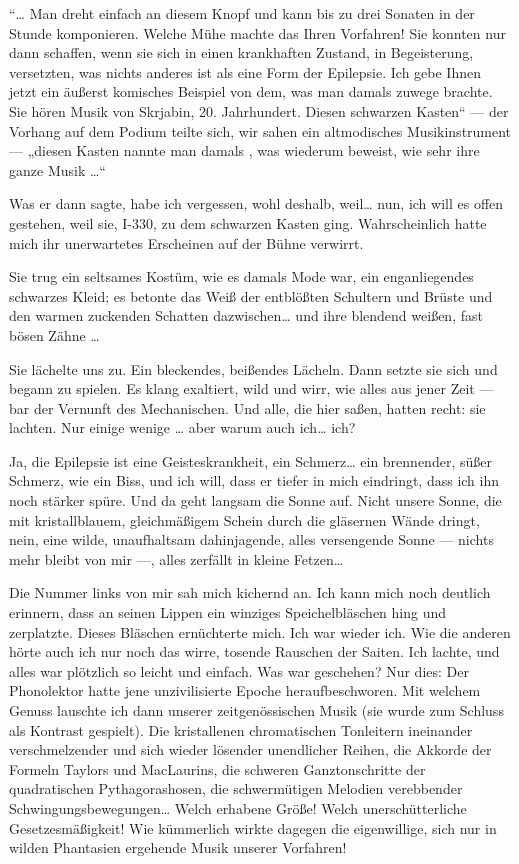 “\ldots{} Man dreht einfach an diesem Knopf und kann bis
zu drei Sonaten in der Stunde komponieren. Welche Mühe machte das
Ihren Vorfahren! Sie konnten nur dann schaffen, wenn sie sich in
einen krankhaften Zustand, in
\glq{}Begeisterung\grq{}, versetzten, was nichts
anderes ist als eine Form der Epilepsie. Ich gebe Ihnen jetzt ein
äußerst komisches Beispiel von dem, was man damals zuwege brachte.
Sie hören Musik von Skrjabin, 20. Jahrhundert. Diesen schwarzen
Kasten“ — der Vorhang auf dem Podium teilte sich, wir sahen ein
altmodisches Musikinstrument — „diesen Kasten nannte man damals
, was wiederum beweist, wie sehr ihre ganze Musik \ldots{}“

Was er
dann sagte, habe ich vergessen, wohl deshalb, weil\ldots{} nun, ich will
es offen gestehen, weil sie, I-330, zu dem schwarzen Kasten ging.
Wahrscheinlich hatte mich ihr unerwartetes Erscheinen auf der Bühne
verwirrt.

Sie trug ein seltsames Kostüm, wie es damals Mode war,
ein enganliegendes schwarzes Kleid; es betonte das Weiß der
entblößten Schultern und Brüste und den warmen zuckenden Schatten
dazwischen\ldots{} und ihre blendend weißen, fast bösen Zähne \ldots{}

Sie lächelte uns zu. Ein bleckendes, beißendes Lächeln. Dann setzte
sie sich und begann zu spielen. Es klang exaltiert, wild und wirr,
wie alles aus jener Zeit — bar der Vernunft des Mechanischen. Und
alle, die hier saßen, hatten recht: sie lachten. Nur einige wenige
\ldots{} aber warum auch ich\ldots{} ich?

Ja, die Epilepsie ist eine Geisteskrankheit, ein Schmerz\ldots{} ein
brennender, süßer Schmerz, wie ein Biss, und ich will, dass er
tiefer in mich eindringt, dass ich ihn noch stärker spüre. Und da
geht langsam die Sonne auf. Nicht unsere Sonne, die mit
kristallblauem, gleichmäßigem Schein durch die gläsernen Wände
dringt, nein, eine wilde, unaufhaltsam dahinjagende, alles
versengende Sonne — nichts mehr bleibt von mir —, alles zerfällt in
kleine Fetzen\ldots{}

Die Nummer links von mir sah mich kichernd an. Ich
kann mich noch deutlich erinnern, dass an seinen Lippen ein
winziges Speichelbläschen hing und zerplatzte. Dieses Bläschen
ernüchterte mich. Ich war wieder ich. Wie die anderen hörte auch
ich nur noch das wirre, tosende Rauschen der Saiten. Ich lachte,
und alles war plötzlich so leicht und einfach. Was war geschehen?
Nur dies: Der Phonolektor hatte jene unzivilisierte Epoche
heraufbeschworen. Mit welchem Genuss lauschte ich dann unserer
zeitgenössischen Musik (sie wurde zum Schluss als Kontrast
gespielt). Die kristallenen chromatischen Tonleitern ineinander
verschmelzender und sich wieder lösender unendlicher Reihen, die
Akkorde der Formeln Taylors und MacLaurins, die schweren
Ganztonschritte der quadratischen Pythagorashosen, die
schwermütigen Melodien verebbender Schwingungsbewegungen\ldots{} Welch
erhabene Größe! Welch unerschütterliche Gesetzesmäßigkeit! Wie
kümmerlich wirkte dagegen die eigenwillige, sich nur in wilden
Phantasien ergehende Musik unserer Vorfahren!

